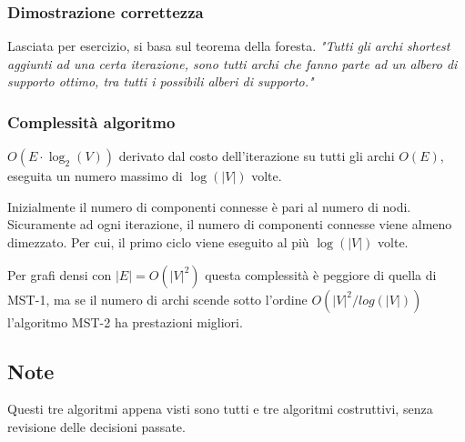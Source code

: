 \documentclass[../template]{subfiles}
\begin{document}
\subsubsection{Dimostrazione correttezza}
Lasciata per esercizio, si basa sul teorema della foresta.
\textit{"Tutti gli archi shortest aggiunti ad una certa iterazione, sono tutti archi
che fanno parte ad un albero di supporto ottimo, tra tutti i possibili
alberi di supporto."}

\subsubsection{Complessità algoritmo}
$O(E \cdot \log_2 (V))$ derivato dal costo dell'iterazione su tutti gli archi
$O(E)$, eseguita un numero massimo di $\log(|V|)$ volte.

Inizialmente il numero di componenti connesse è pari al numero di nodi.
Sicuramente ad ogni iterazione, il numero di componenti connesse viene
almeno dimezzato. Per cui, il primo ciclo viene eseguito al più $\log(|V|)$
volte.

Per grafi densi con $|E| = O(|V|^2)$ questa complessità
è peggiore di quella di MST-1, ma se il numero di archi scende sotto l'ordine $O(|V|^2/log(|V|))$ l'algoritmo MST-2 ha prestazioni migliori.

\subsection{Note}
Questi tre algoritmi appena visti sono tutti e tre algoritmi costruttivi, senza revisione delle decisioni passate.
\end{document}
